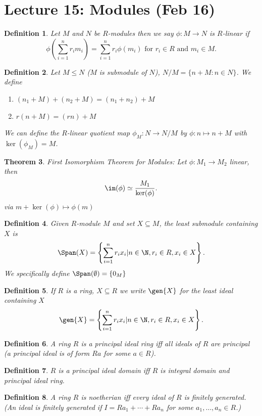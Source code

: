 \documentclass[a4paper,12pt]{article}
\newtheorem{thm}{Theorem}[section]
\newtheorem{defn}[thm]{Definition}
\begin{document}
\section{Lecture 15: Modules (Feb 16)}
\begin{defn}
    Let $M$ and $N$ be $R$-modules then we say $\phi:M\to N$ is $R$-linear if \[
    \phi\left(\sum_{i=1}^n r_im_i\right)=\sum_{i=1}^nr_i \phi(m_i) \text{ for } r_i\in R \text{ and } m_i\in M
    .\] 
\end{defn}
\begin{defn}
    Let $M\leq N$ ($M$ is submodule of $N$), $N/M=\{n+M: n\in N\}$. We define \begin{enumerate}
        \item $(n_1+M)+(n_2+M)=(n_1+n_2)+M$
        \item $r(n+M)=(rn)+M$
    \end{enumerate}
    We can define the $R$-linear quotient map $\phi_M:N\to N/M$ by $\phi:n\mapsto n+M$ with $\ker(\phi_M)=M$.
\end{defn}
\begin{thm}
    First Isomorphism Theorem for Modules: Let $\phi:M_1\to M_2$ linear, then \[
    \im(\phi)\simeq \frac{M_1}{\ker(\phi)}
    .\] 
    via $m+\ker(\phi)\mapsto \phi(m)$
\end{thm}
\begin{defn}
    Given $R$-module $M$ and set $X\subseteq M$, the least submodule containing $X$ is \[
    \Span(X)= \left\{\sum_{i=1}^n r_i x_i | n\in \N, r_i\in R, x_i\in X\right\}
    .\] 
    We specifically define $\Span(\emptyset)= \{0_M\}$
\end{defn}
\begin{defn}
    If $R$ is a ring, $X\subseteq R$ we write $\gen{X}$ for the least ideal containing $X$ \[
    \gen{X}= \left\{\sum_{i=1}^n r_i x_i | n\in \N, r_i\in R, x_i\in X\right\}
    .\] 
\end{defn}
\begin{defn}
    A ring $R$ is a principal ideal ring iff all ideals of $R$ are principal (a principal ideal is of form $Ra$ for some $a\in R$).
\end{defn}
\begin{defn}
    $R$ is a principal ideal domain iff $R$ is integral domain and principal ideal ring. 
\end{defn}
\begin{defn}
    A ring $R$ is noetherian iff every ideal of $R$ is finitely generated. (An ideal is finitely generated if $I=Ra_1+\cdots+Ra_n$ for some $a_1, \ldots, a_n\in R$.)
\end{defn}
\end{document}

